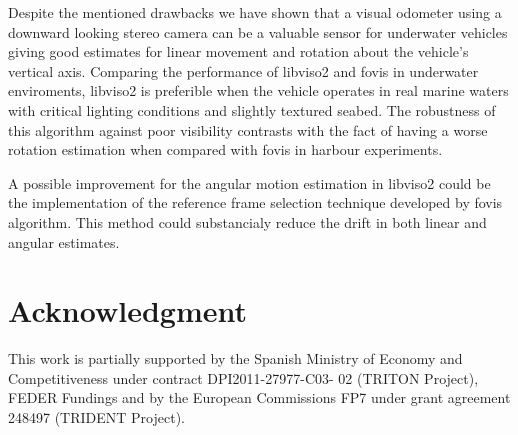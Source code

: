 \documentclass[conference]{IEEEtran}
\begin{document}
Despite the mentioned drawbacks we have shown that a visual odometer using a downward looking stereo camera can be a valuable sensor for underwater vehicles giving good estimates for linear movement and rotation about the vehicle's vertical axis. Comparing the performance of libviso2 and fovis in underwater enviroments, libviso2 is preferible when the vehicle operates in real marine waters with critical lighting conditions and slightly textured seabed. The robustness of this algorithm against poor visibility contrasts with the fact of having a worse rotation estimation when compared with fovis in harbour experiments.

A possible improvement for the angular motion estimation in libviso2 could be the implementation of the reference frame selection technique developed by fovis algorithm. This method could substancialy reduce the drift in both linear and angular estimates.

\section{Acknowledgment
  \label{acknowledgment}
}

This work is partially supported by the Spanish Ministry of Economy and Competitiveness under contract DPI2011-27977-C03- 02 (TRITON Project), FEDER Fundings and by the European Commissions FP7 under grant agreement 248497 (TRIDENT Project).




\end{document}

